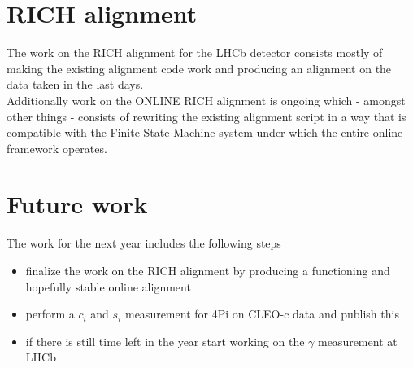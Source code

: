 \section{RICH alignment}
The work on the RICH alignment for the LHCb detector consists mostly of making the existing alignment code work and producing an alignment on the data taken in the last days.\\
Additionally work on the ONLINE RICH alignment is ongoing which - amongst other things - consists of rewriting the existing alignment script in a way that is compatible with the Finite State Machine system under which the entire online framework operates.\\

\section{Future work}
The work for the next year includes the following steps
\begin{itemize}
\item finalize the work on the RICH alignment by producing a functioning and hopefully stable online alignment 
\item perform a $c_i$ and $s_i$ measurement for \DTo4Pi on CLEO-c data and publish this
\item if there is still time left in the year start working on the $\gamma$ measurement at LHCb
\end{itemize}

\newpage

